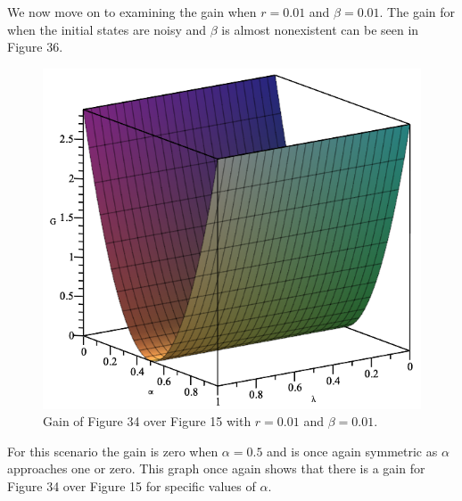 \documentclass[twocolumn]{article}
\begin{document}
We now move on to examining the gain when $r=0.01$ and $\beta=0.01$. The gain for when the initial states are noisy and $\beta$ is almost nonexistent can be seen in Figure 36.
\begin{figure}[h]
\begin{center}
\includegraphics[width=0.65\linewidth]{Phase-Flip-Triple-Channel-r=001-Beta=001-Gain-Graph.png}
\caption{Gain of Figure 34 over Figure 15 with $r=0.01$ and $\beta=0.01$.}
\end{center}
\end{figure}
\newline
For this scenario the gain is zero when $\alpha=0.5$ and is once again symmetric as $\alpha$ approaches one or zero. This graph once again shows that there is a gain for Figure 34 over Figure 15 for specific values of $\alpha$.
\end{document}
